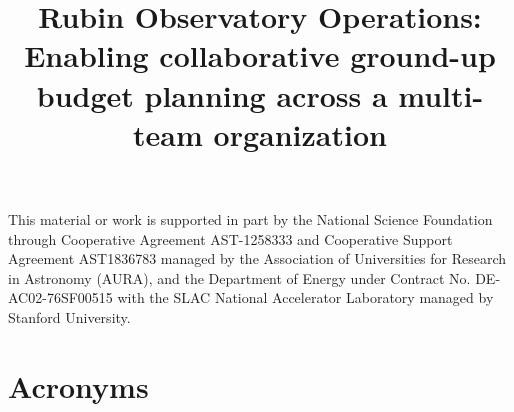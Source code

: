 \documentclass[]{spie}
\begin{document}

\title{Rubin Observatory Operations: Enabling collaborative ground-up budget planning across a multi-team organization}


\maketitle






\acknowledgments
This material or work is supported in part by the National Science Foundation through Cooperative Agreement AST-1258333 and Cooperative Support Agreement AST1836783 managed by the Association of Universities for Research in Astronomy (AURA), and the Department of Energy under Contract No. DE-AC02-76SF00515 with the SLAC National Accelerator Laboratory managed by Stanford University.




\section*{Acronyms} \label{sec:acronyms}

\end{document}
